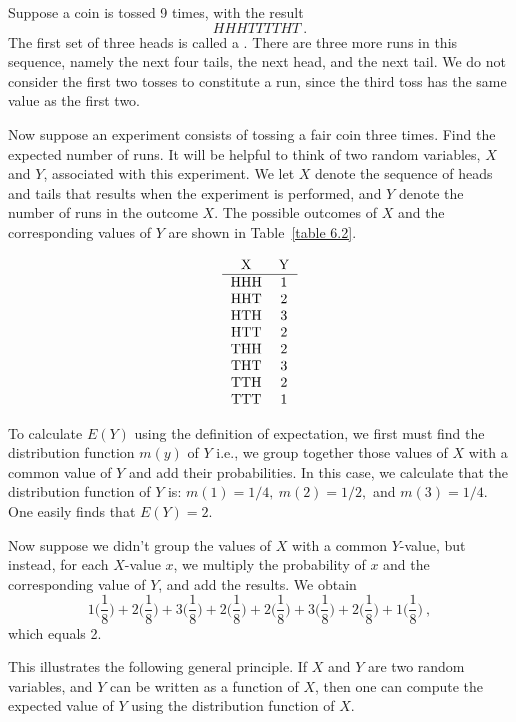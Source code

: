 \begin{example}\label{exam 6.1.5} Suppose a coin is tossed 9 times, with the result
\[ HHHTTTTHT\ . \]    
\noindent The first set of three heads is called a  .  There are three
more runs in this sequence, namely the next four tails, the next head, and the next
tail.  We do not consider the first two tosses to constitute a run, since the third
toss has the same value as the first two.
\par Now suppose an experiment consists of tossing a fair coin three times.  Find the
expected number of runs.   It will be helpful to think of two random variables, $X$
and $Y$, associated with this experiment.  We let $X$ denote the sequence of heads
and tails that results when the experiment is performed, and $Y$ denote the number of
runs in the outcome
$X$.  The possible outcomes of $X$ and the corresponding values of $Y$  are
shown in Table~\ref{table 6.2}.
\begin{table}
\centering
$$\begin{tabular}{cc} X    &  Y \\ \hline HHH  & 1\\ HHT  & 2\\ HTH  & 3\\ HTT  & 2\\
THH  & 2\\ THT  & 3\\ TTH  & 2\\ TTT  & 1\\
\end{tabular}
$$
\caption{Tossing a coin three times.}
\label{table 6.2}
\end{table}

To calculate $E(Y)$ using the definition of expectation, we first must find the
distribution function $m(y)$ of $Y$ i.e., we group together those values of $X$ with
a common value of
$Y$ and add their probabilities.  In this case, we calculate that the distribution
function of $Y$ is:  $m(1) = 1/4,\ m(2) = 1/2,$ and $m(3) = 1/4$.  One easily finds
that $E(Y) = 2$.  
\par Now suppose we didn't group the values of $X$ with a common $Y$-value, but
instead, for each
$X$-value $x$, we multiply the probability of $x$ and the corresponding value of $Y$,
and add the results.  We obtain
$$1\biggl(\frac 18\biggr) +2\biggl(\frac 18\biggr) +3\biggl(\frac 18\biggr)
+2\biggl(\frac 18\biggr) +2\biggl(\frac 18\biggr) +3\biggl(\frac 18\biggr)
+2\biggl(\frac 18\biggr) +1\biggl(\frac 18\biggr)\ ,$$ which equals 2.
\par This illustrates the following general principle.  If $X$ and $Y$ are two random
variables, and $Y$ can be written as a function of $X$, then one can compute the
expected value of $Y$ using the distribution function of $X$.
\end{example}

